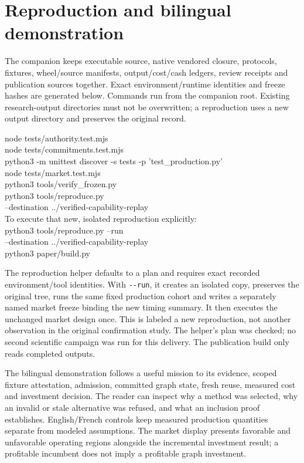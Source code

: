 \documentclass[11pt,a4paper]{article}
\newcommand{\code}[1]{\nolinkurl{#1}}
\begin{document}
\section{Reproduction and bilingual demonstration}
\label{app:reproduce}
The companion keeps executable source, native vendored closure, protocols, fixtures, wheel/source manifests, output/cost/cash ledgers, review receipts and publication sources together. Exact environment/runtime identities and freeze hashes are generated below. Commands run from the companion root. Existing research-output directories must not be overwritten; a reproduction uses a new output directory and preserves the original record.

\begin{tcolorbox}[colback=AlphaLilac,colframe=AlphaPurple,boxrule=.4pt,arc=0mm]
\small\ttfamily
node tests/authority.test.mjs\\
node tests/commitments.test.mjs\\
python3 -m unittest discover -s tests -p 'test\_production.py'\\
node tests/market.test.mjs\\
python3 tools/verify\_frozen.py\\
python3 tools/reproduce.py\\
\hspace*{4mm}--destination ../verified-capability-replay\\
\textnormal{To execute that new, isolated reproduction explicitly:}\\
python3 tools/reproduce.py --run\\
\hspace*{4mm}--destination ../verified-capability-replay\\
python3 paper/build.py
\end{tcolorbox}

The reproduction helper defaults to a plan and requires exact recorded environment/tool identities. With \code{--run}, it creates an isolated copy, preserves the original tree, runs the same fixed production cohort and writes a separately named market freeze binding the new timing summary. It then executes the unchanged market design once. This is labeled a new reproduction, not another observation in the original confirmation study. The helper's plan was checked; no second scientific campaign was run for this delivery. The publication build only reads completed outputs.

The bilingual demonstration follows a useful mission to its evidence, scoped fixture attestation, admission, committed graph state, fresh reuse, measured cost and investment decision. The reader can inspect why a method was selected, why an invalid or stale alternative was refused, and what an inclusion proof establishes. English/French controls keep measured production quantities separate from modeled assumptions. The market display presents favorable and unfavorable operating regions alongside the incremental investment result; a profitable incumbent does not imply a profitable graph investment.
\end{document}
